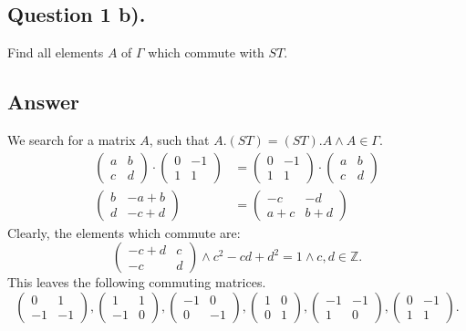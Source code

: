 \subsection{Question 1 b).}
\noindent
Find all elements $A$ of $\Gamma$ which commute with $ST$.

\subsection*{Answer}
\noindent
We search for a matrix $A$, such that $A.(ST) = (ST).A \wedge A \in \Gamma$.
\begin{align*}
    \begin{pmatrix}
        a & b\\
        c & d
    \end{pmatrix} \cdot
    \begin{pmatrix}
        0 & -1\\
        1 & 1
    \end{pmatrix}
    &=
    \begin{pmatrix}
        0 & -1\\
        1 & 1
    \end{pmatrix} \cdot
    \begin{pmatrix}
        a & b\\
        c & d
    \end{pmatrix} \\
    \begin{pmatrix}
        b & -a+b\\
        d & -c+d
    \end{pmatrix}
    &=
    \begin{pmatrix}
        -c & -d\\
        a+c & b+d
    \end{pmatrix}
\end{align*}
Clearly, the elements which commute are:
\[
    \begin{pmatrix}
        -c+d & c\\
        -c & d
    \end{pmatrix}
    \wedge c^2 -c d + d^2 = 1 \wedge c,d \in \mathbb{Z}.
\]
This leaves the following commuting matrices.
\[
    \begin{pmatrix}
        0 & 1\\
        -1 & -1
    \end{pmatrix},
    \begin{pmatrix}
        1 & 1\\
        -1 & 0
    \end{pmatrix},
    \begin{pmatrix}
        -1 & 0\\
        0 & -1
    \end{pmatrix},
    \begin{pmatrix}
        1 & 0\\
        0 & 1
    \end{pmatrix},
    \begin{pmatrix}
        -1 & -1\\
        1 & 0
    \end{pmatrix},
    \begin{pmatrix}
        0 & -1\\
        1 & 1
    \end{pmatrix}.
\]